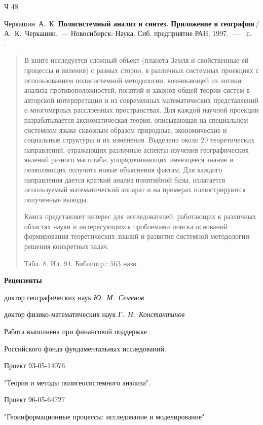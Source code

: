 \documentclass[14pt,draft,openany]{extbook}
\begin{document}
\noindent{}\begin{minipage}[t]{3em}
\noindent{}Ч 48%
\end{minipage}\hfill{}%
\begin{minipage}[t]{0.90\linewidth}
\setlength{\parindent}{3.5ex}

Черкашин~А.~К. {\bfseries Полисистемный анализ и синтез. Приложение в географии}\,{}/
А.~К.~Черкашин.~--- Новосибирск: Наука. Сиб. предприятие
РАН, 1997.~---~\pageref{LastPage}~с.\\[0.3em]
\ISBN{}.
\vspace{1em}

\begin{abstract}\small
В книге исследуется сложный объект (планета Земля и свойственные ей процессы и явления) с разных сторон, в различных системных проекциях с использованием полисистемной методологии, возникающей из логики анализа противоположностей, понятий и законов общей теории систем в авторской интерпретации и из современных математических представлений о многомерных расслоенных пространствах. Для каждой научной проекции разрабатывается аксиоматическая теория, описывающая на специальном системном языке сквозным образом природные, экономические и социальные структуры и их изменения. Выделено около 20 теоретических направлений, отражающих различные аспекты изучения географических явлений разного масштаба, упорядочивающих имеющееся знание и позволяющих получить новые объяснения фактам. Для каждого направления дается краткий анализ понятийной базы, излагается используемый математический аппарат и на примерах иллюстрируются полученные выводы.

Книга представляет интерес для исследователей, работающих к различных областях науки и интересующихся проблемами поиска оснований формирования теоретических знаний и развития системной методологии решения конкретных задач.

Табл. 8. Ил. 94. Библиогр.: 563 назв.
\end{abstract}

\vspace{2em}
\centering
\textbf{Рецензенты}

доктор географических наук \textit{Ю.~М.~Семенов}

доктор физико-математических наук \textit{Г.~Н.~Константинов}
\vspace{1ex}

Работа выполнена при финансовой поддержке

Российского фонда фундаментальных исследований.

Проект 93-05-14076

"Теория и методы полигеосистемного анализа".

Проект 96-05-64727

"Геоинформационные процессы: исследование и моделирование"
\end{minipage}
\end{document}

